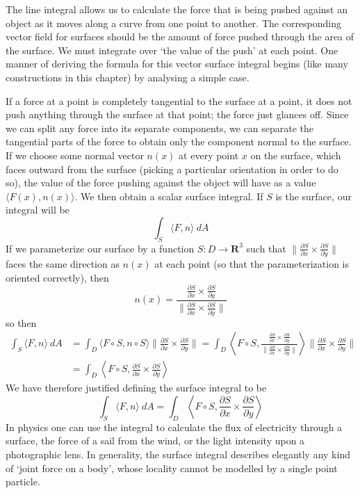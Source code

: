 The line integral allows us to calculate the force that is being pushed against an object as it moves along a curve from one point to another. The corresponding vector field for surfaces should be the amount of force pushed through the area of the surface. We must integrate over `the value of the push' at each point. One manner of deriving the formula for this vector surface integral begins (like many constructions in this chapter) by analysing a simple case.

If a force at a point is completely tangential to the surface at a point, it does not push anything through the surface at that point; the force just glances off. Since we can split any force into its separate components, we can separate the tangential parts of the force to obtain only the component normal to the surface. If we choose some normal vector $n(x)$ at every point $x$ on the surface, which faces outward from the surface (picking a particular orientation in order to do so), the value of the force pushing against the object will have as a value $\langle F(x), n(x) \rangle$. We then obtain a scalar surface integral. If $S$ is the surface, our integral will be
%
\[ \int_S \langle F, n \rangle\ dA \]
%
If we parameterize our surface by a function $S:D \to \mathbf{R}^3$ such that $\| \frac{\partial S}{\partial x} \times \frac{\partial S}{\partial y} \|$ faces the same direction as $n(x)$ at each point (so that the parameterization is oriented correctly), then
%
\[ n(x) = \frac{\frac{\partial S}{\partial x} \times \frac{\partial S}{\partial y}}{\| \frac{\partial S}{\partial x} \times \frac{\partial S}{\partial y} \|} \]
%
so then
%
\begin{align*}
    \int_S \langle F, n \rangle\ dA &= \int_D \langle F \circ S, n \circ S \rangle \bigg\| \frac{\partial S}{\partial x} \times \frac{\partial S}{\partial y} \bigg\| = \int_D \left\langle F \circ S, \frac{\frac{\partial S}{\partial x} \times \frac{\partial S}{\partial y}}{\| \frac{\partial S}{\partial x} \times \frac{\partial S}{\partial y} \|} \right\rangle \bigg\| \frac{\partial S}{\partial x} \times \frac{\partial S}{\partial y} \bigg\|\\
    &= \int_D \left\langle F \circ S, \frac{\partial S}{\partial x} \times \frac{\partial S}{\partial y} \right\rangle
\end{align*}
%
We have therefore justified defining the surface integral to be
%
\[ \int_S \langle F, n \rangle\ dA = \int_D \left\langle F \circ S, \frac{\partial S}{\partial x} \times \frac{\partial S}{\partial y} \right\rangle \]
%
In physics one can use the integral to calculate the flux of electricity through a surface, the force of a sail from the wind, or the light intensity upon a photographic lens. In generality, the surface integral describes elegantly any kind of `joint force on a body', whose locality cannot be modelled by a single point particle.

